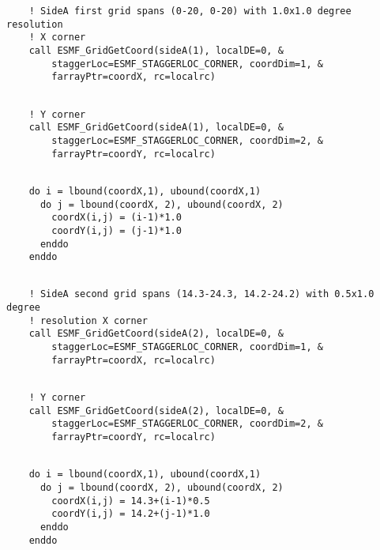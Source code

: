  \begin{verbatim}
    ! SideA first grid spans (0-20, 0-20) with 1.0x1.0 degree resolution
    ! X corner
    call ESMF_GridGetCoord(sideA(1), localDE=0, &
        staggerLoc=ESMF_STAGGERLOC_CORNER, coordDim=1, &
        farrayPtr=coordX, rc=localrc)
 
\end{verbatim}
 

 \begin{verbatim}
    ! Y corner
    call ESMF_GridGetCoord(sideA(1), localDE=0, &
        staggerLoc=ESMF_STAGGERLOC_CORNER, coordDim=2, &
        farrayPtr=coordY, rc=localrc)
 
\end{verbatim}
 

 \begin{verbatim}
    do i = lbound(coordX,1), ubound(coordX,1)
      do j = lbound(coordX, 2), ubound(coordX, 2)
        coordX(i,j) = (i-1)*1.0
        coordY(i,j) = (j-1)*1.0
      enddo
    enddo
 
\end{verbatim}
 

 \begin{verbatim}
    ! SideA second grid spans (14.3-24.3, 14.2-24.2) with 0.5x1.0 degree
    ! resolution X corner
    call ESMF_GridGetCoord(sideA(2), localDE=0, &
        staggerLoc=ESMF_STAGGERLOC_CORNER, coordDim=1, &
        farrayPtr=coordX, rc=localrc)
 
\end{verbatim}
 

 \begin{verbatim}
    ! Y corner
    call ESMF_GridGetCoord(sideA(2), localDE=0, &
        staggerLoc=ESMF_STAGGERLOC_CORNER, coordDim=2, &
        farrayPtr=coordY, rc=localrc)
 
\end{verbatim}
 

 \begin{verbatim}
    do i = lbound(coordX,1), ubound(coordX,1)
      do j = lbound(coordX, 2), ubound(coordX, 2)
        coordX(i,j) = 14.3+(i-1)*0.5
        coordY(i,j) = 14.2+(j-1)*1.0
      enddo
    enddo
 
\end{verbatim}
 
